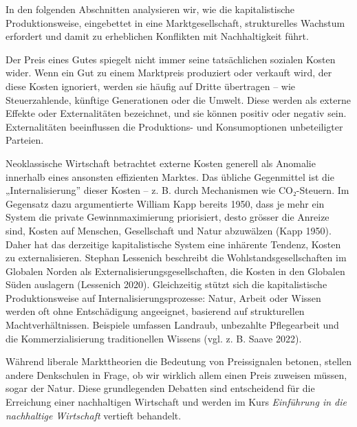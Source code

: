 \documentclass[
  nswissgerman,
  a4paper,
  DIV=11,
  numbers=noendperiod,
  oneside,
  openany]{scrreprt}
\begin{document}
In den folgenden Abschnitten analysieren wir, wie die kapitalistische
Produktionsweise, eingebettet in eine Marktgesellschaft, strukturelles
Wachstum erfordert und damit zu erheblichen Konflikten mit
Nachhaltigkeit führt.

\begin{tcolorbox}[enhanced jigsaw, arc=.35mm, bottomrule=.15mm, bottomtitle=1mm, breakable, colback=white, colbacktitle=quarto-callout-note-color!10!white, colframe=quarto-callout-note-color-frame, coltitle=black, left=2mm, leftrule=.75mm, opacityback=0, opacitybacktitle=0.6, rightrule=.15mm, title={Internalisieren und Externalisieren}, titlerule=0mm, toprule=.15mm, toptitle=1mm]

Der Preis eines Gutes spiegelt nicht immer seine tatsächlichen sozialen
Kosten wider. Wenn ein Gut zu einem Marktpreis produziert oder verkauft
wird, der diese Kosten ignoriert, werden sie häufig auf Dritte
übertragen -- wie Steuerzahlende, künftige Generationen oder die Umwelt.
Diese werden als externe Effekte oder Externalitäten bezeichnet, und sie
können positiv oder negativ sein. Externalitäten beeinflussen die
Produktions- und Konsumoptionen unbeteiligter Parteien.

Neoklassische Wirtschaft betrachtet externe Kosten generell als Anomalie
innerhalb eines ansonsten effizienten Marktes. Das übliche Gegenmittel
ist die „Internalisierung'' dieser Kosten -- z. B. durch Mechanismen wie
CO₂-Steuern. Im Gegensatz dazu argumentierte William Kapp bereits 1950,
dass je mehr ein System die private Gewinnmaximierung priorisiert, desto
grösser die Anreize sind, Kosten auf Menschen, Gesellschaft und Natur
abzuwälzen (Kapp 1950). Daher hat das derzeitige kapitalistische System
eine inhärente Tendenz, Kosten zu externalisieren. Stephan Lessenich
beschreibt die Wohlstandsgesellschaften im Globalen Norden als
Externalisierungsgesellschaften, die Kosten in den Globalen Süden
auslagern (Lessenich 2020). Gleichzeitig stützt sich die kapitalistische
Produktionsweise auf Internalisierungsprozesse: Natur, Arbeit oder
Wissen werden oft ohne Entschädigung angeeignet, basierend auf
strukturellen Machtverhältnissen. Beispiele umfassen Landraub,
unbezahlte Pflegearbeit und die Kommerzialisierung traditionellen
Wissens (vgl. z. B. Saave 2022).

Während liberale Markttheorien die Bedeutung von Preissignalen betonen,
stellen andere Denkschulen in Frage, ob wir wirklich allem einen Preis
zuweisen müssen, sogar der Natur. Diese grundlegenden Debatten sind
entscheidend für die Erreichung einer nachhaltigen Wirtschaft und werden
im Kurs \emph{Einführung in die nachhaltige Wirtschaft} vertieft
behandelt.

\end{tcolorbox}
\end{document}
